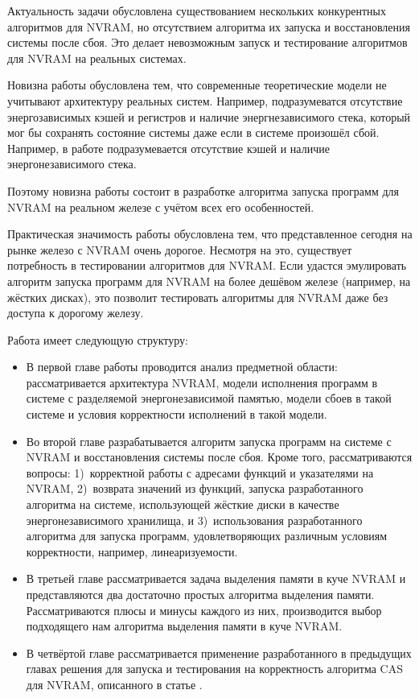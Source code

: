 \documentclass[times,specification,annotation]{itmo-student-thesis}
\begin{document}
\bigbreak

Актуальность задачи обусловлена существованием нескольких конкурентных алгоритмов для NVRAM, но отсутствием алгоритма их запуска и восстановления системы после сбоя. Это делает невозможным запуск и тестирование алгоритмов для NVRAM на реальных системах.

\bigbreak

Новизна работы обусловлена тем, что современные теоретические модели не учитывают архитектуру реальных систем. Например, подразумеватся отсутствие энергозависимых кэшей и регистров и наличие энергнезависимого стека, который мог бы сохранять состояние системы даже если в системе произошёл сбой. Например, в работе \cite{attiya2018nesting} подразумевается отсутствие кэшей и наличие энергонезависимого стека.

Поэтому новизна работы состоит в разработке алгоритма запуска программ для NVRAM на реальном железе с учётом всех его особенностей.

\bigbreak

Практическая значимость работы обусловлена тем, что представленное сегодня на рынке железо с NVRAM очень дорогое. Несмотря на это, существует потребность в тестировании алгоритмов для NVRAM. Если удастся эмулировать алгоритм запуска программ для NVRAM на более дешёвом железе (например, на жёстких дисках), это позволит тестировать алгоритмы для NVRAM даже без доступа к дорогому железу.

\bigbreak

Работа имеет следующую структуру:

\begin{itemize}
    \item В первой главе работы проводится анализ предметной области: рассматривается архитектура NVRAM, модели исполнения программ в системе с разделяемой энергонезависимой памятью, модели сбоев в такой системе и условия корректности исполнений в такой модели.
    
    \item Во второй главе разрабатывается алгоритм запуска программ на системе с NVRAM и восстановления системы после сбоя. Кроме того, рассматриваются вопросы: 1)~корректной работы с адресами функций и указателями на NVRAM, 2)~возврата значений из функций, запуска разработанного алгоритма на системе, использующей жёсткие диски в качестве энергонезависимого хранилища, и 3)~использования разработанного алгоритма для запуска программ, удовлетворяющих различным условиям корректности, например, линеаризуемости.

    \item В третьей главе рассматривается задача выделения памяти в куче NVRAM и представляются два достаточно простых алгоритма выделения памяти. Рассматриваются плюсы и минусы каждого из них, производится выбор подходящего нам алгоритма выделения памяти в куче NVRAM.
    
    \item В четвёртой главе рассматривается применение разработанного в предыдущих главах решения для запуска и тестирования на корректность алгоритма CAS для NVRAM, описанного в статье \cite{attiya2018nesting}. 
\end{itemize}
\end{document}
